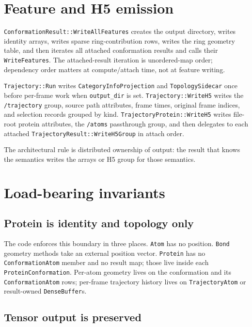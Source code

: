 \documentclass[11pt]{article}
\newcommand{\code}[1]{\texttt{#1}}
\begin{document}
\section{Feature and H5 emission}

\code{ConformationResult::WriteAllFeatures} creates the output directory,
writes identity arrays, writes sparse ring-contribution rows, writes the ring
geometry table, and then iterates all attached conformation results and calls
their \code{WriteFeatures}. The attached-result iteration is unordered-map
order; dependency order matters at compute/attach time, not at feature writing.

\code{Trajectory::Run} writes \code{CategoryInfoProjection} and
\code{TopologySidecar} once before per-frame work when \code{output\_dir} is
set. \code{Trajectory::WriteH5} writes the \code{/trajectory} group, source path
attributes, frame times, original frame indices, and selection records grouped
by kind. \code{TrajectoryProtein::WriteH5} writes file-root protein attributes,
the \code{/atoms} passthrough group, and then delegates to each attached
\code{TrajectoryResult::WriteH5Group} in attach order.

The architectural rule is distributed ownership of output: the result that
knows the semantics writes the arrays or H5 group for those semantics.

\section{Load-bearing invariants}

\subsection{Protein is identity and topology only}

The code enforces this boundary in three places. \code{Atom} has no position.
\code{Bond} geometry methods take an external position vector. \code{Protein}
has no \code{ConformationAtom} member and no result map; those live inside each
\code{ProteinConformation}. Per-atom geometry lives on the conformation and its
\code{ConformationAtom} rows; per-frame trajectory history lives on
\code{TrajectoryAtom} or result-owned \code{DenseBuffer}s.

\subsection{Tensor output is preserved}
\end{document}

